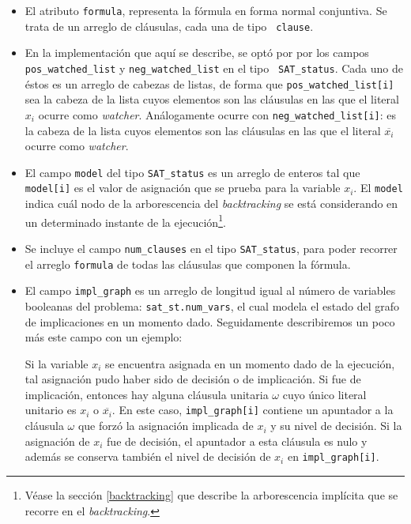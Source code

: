 \documentclass[12pt,lettersize,oneside]{article}
\begin{document}
\begin{itemize}
\item El atributo {\tt formula}, representa la fórmula en forma normal
  conjuntiva. Se trata de un arreglo de cláusulas, cada una de tipo {\tt
    clause}.
\item En la implementación que aquí se describe, se optó por por los campos {\tt
    pos\_watched\_list} y {\tt neg\_watched\_list} en el tipo {\tt
    SAT\_status}. Cada uno de éstos es un arreglo de cabezas de listas, de forma
  que {\tt pos\_watched\_list[i]} sea la cabeza de la lista cuyos elementos son
  las cláusulas en las que el literal $x_i$ ocurre como
  \emph{watcher}. Análogamente ocurre con {\tt neg\_watched\_list[i]}: es la
  cabeza de la lista cuyos elementos son las cláusulas en las que el literal
  $\overline{x_i}$ ocurre como \emph{watcher}.

\item El campo {\tt model} del tipo {\tt SAT\_status} es un arreglo de enteros
  tal que {\tt model[i]} es el valor de asignación que se prueba para la
  variable $x_i$. El {\tt model} indica cuál nodo de la arborescencia del
  \emph{backtracking} se está considerando en un determinado instante de la
  ejecución\footnote{Véase la sección \ref{backtracking} que describe la
    arborescencia implícita que se recorre en el \emph{backtracking}.}.

\item Se incluye el campo {\tt num\_clauses} en el tipo {\tt SAT\_status}, para
  poder recorrer el arreglo {\tt formula} de todas las cláusulas que componen la
  fórmula.

\item El campo {\tt impl\_graph} es un arreglo de longitud igual al número de
  variables booleanas del problema: {\tt sat\_st.num\_vars}, el cual modela el
  estado del grafo de implicaciones en un momento dado. Seguidamente
  describiremos un poco más este campo con un ejemplo:

  Si la variable $x_i$ se encuentra asignada en un momento dado de la ejecución,
  tal asignación pudo haber sido de decisión o de implicación. Si fue de
  implicación, entonces hay alguna cláusula unitaria $\omega$ cuyo único literal
  unitario es $x_i$ o $\overline{x_i}$. En este caso, {\tt impl\_graph[i]}
  contiene un apuntador a la cláusula $\omega$ que forzó la asignación implicada
  de $x_i$ y su nivel de decisión. Si la asignación de $x_i$ fue de decisión, el
  apuntador a esta cláusula es nulo y además se conserva también el nivel de
  decisión de $x_i$ en {\tt impl\_graph[i]}.


\end{itemize}
\end{document}
